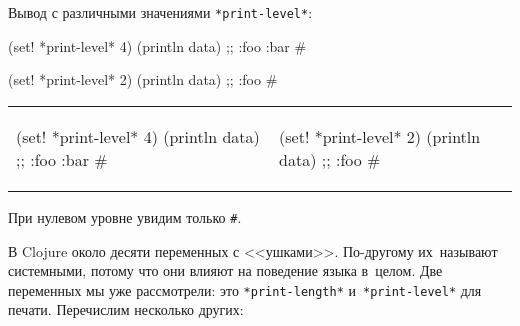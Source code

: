 Вывод с различными значениями \texttt{*print\--le\-vel*}:

\ifx\DEVICETYPE\MOBILE

\begin{english}
  \begin{clojure}
(set! *print-level* 4)
(println data)
;; {:foo {:bar #}}
  \end{clojure}

\splitter

  \begin{clojure}
(set! *print-level* 2)
(println data)
;; {:foo #}
  \end{clojure}
\end{english}

\else

\begin{english}
\noindent
\begin{tabular}{ @{}p{5cm} @{}p{5cm} }


  \begin{clojure}
(set! *print-level* 4)
(println data)
;; {:foo {:bar #}}
  \end{clojure}

&

  \begin{clojure}
(set! *print-level* 2)
(println data)
;; {:foo #}
  \end{clojure}

\end{tabular}

\end{english}

\fi

\noindent
При нулевом уровне увидим только \verb|#|.

В Clojure около десяти переменных с <<ушками>>. По-другому их~называют
системными, потому что они влияют на поведение языка в~целом. Две переменных мы
уже рассмотрели: это \verb|*print-length*| и~\verb|*print-level*| для
печати. Перечислим несколько других:


